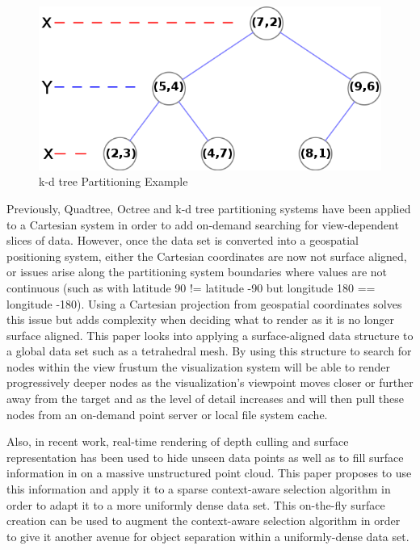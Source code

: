 \begin{figure}[htb]
\begin{center}
\includegraphics[width=.5\linewidth]{images/kdtree_layers.png}
\end{center}
\caption{k-d tree Partitioning Example \cite{13_tree_0001.svg}}
\label{fig:kdtreelayers}
\end{figure}

Previously, Quadtree, Octree \cite{3_wenzel2014out} and k-d tree partitioning
systems have been applied to a Cartesian system in order to add on-demand
searching for view-dependent slices of data. However, once the data set is
converted into a geospatial positioning system, either the Cartesian coordinates
are now not surface aligned, or issues arise along the partitioning system
boundaries where values are not continuous (such as with latitude 90 != latitude
-90 but longitude 180 == longitude -180). Using a Cartesian projection from
geospatial coordinates solves this issue but adds complexity when deciding what
to render as it is no longer surface aligned. This paper looks into applying a
surface-aligned data structure to a global data set such as a tetrahedral mesh.
By using this structure to search for nodes within the view frustum the
visualization system will be able to render progressively deeper nodes as the
visualization's viewpoint moves closer or further away from the target and as
the level of detail increases and will then pull these nodes from an on-demand
point server or local file system cache.

Also, in recent work, real-time rendering of depth culling and surface
representation \cite{1_VAST:VAST11:105-112} has been used to hide unseen data
points as well as to fill surface information in on a massive unstructured point
cloud. This paper proposes to use this information and apply it to a sparse
context-aware selection algorithm \cite{2_yu:hal-01178051} in order to adapt it
to a more uniformly dense data set. This on-the-fly surface creation can be used
to augment the context-aware selection algorithm in order to give it another
avenue for object separation within a uniformly-dense data set.
